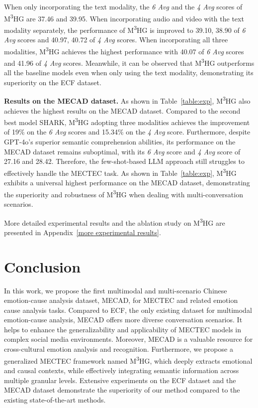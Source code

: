 \documentclass[11pt]{article}
\begin{document}
When only incorporating the text modality, the \textit{6 Avg} and the \textit{4 Avg} scores of M\textsuperscript{3}HG are 37.46 and 39.95.
When incorporating audio and video with the text modality separately, the performance of M\textsuperscript{3}HG is improved to 39.10, 38.90 of \textit{6 Avg} scores and 40.97, 40.72 of \textit{4 Avg} scores.
When incorporating all three modalities, M\textsuperscript{3}HG achieves the highest performance with 40.07 of \textit{6 Avg} scores and 41.96 of \textit{4 Avg} scores.
Meanwhile, it can be observed that M\textsuperscript{3}HG outperforms all the baseline models even when only using the text modality, demonstrating its superiority on the ECF dataset.

\noindent\textbf{Results on the MECAD dataset.} As shown in Table~\ref{table:exp}, M\textsuperscript{3}HG also achieves the highest results on the MECAD dataset.
Compared to the second best model SHARK, M\textsuperscript{3}HG adopting three modalities achieves the improvement of 19\% on the \textit{6 Avg} scores and 15.34\% on the \textit{4 Avg} score.
Furthermore, despite GPT-4o’s superior semantic comprehension abilities, its performance on the MECAD dataset remains suboptimal, with its \textit{6 Avg} score and \textit{4 Avg} score of 27.16 and 28.42.
Therefore, the few-shot-based LLM approach still struggles to effectively handle the MECTEC task.
As shown in Table~\ref{table:exp}, M\textsuperscript{3}HG exhibits a universal highest performance on the MECAD dataset, demonstrating the superiority and robustness of M\textsuperscript{3}HG when dealing with multi-conversation scenarios.

More detailed experimental results and the ablation study on M\textsuperscript{3}HG are presented in Appendix~\ref{more experimental results}.


\section{Conclusion}
In this work, we propose the first multimodal and multi-scenario Chinese emotion-cause analysis dataset, MECAD, for MECTEC and related emotion cause analysis tasks.
Compared to ECF, the only existing dataset for multimodal emotion-cause analysis, MECAD offers more diverse conversation scenarios.
It helps to enhance the generalizability and applicability of MECTEC models in complex social media environments.
Moreover, MECAD is a valuable resource for cross-cultural emotion analysis and recognition.
Furthermore, we propose a generalized MECTEC framework named M\textsuperscript{3}HG, which deeply extracts emotional and causal contexts, while effectively integrating semantic information across multiple granular levels.
Extensive experiments on the ECF dataset and the MECAD dataset demonstrate the superiority of our method compared to the existing state-of-the-art methods.
\end{document}
